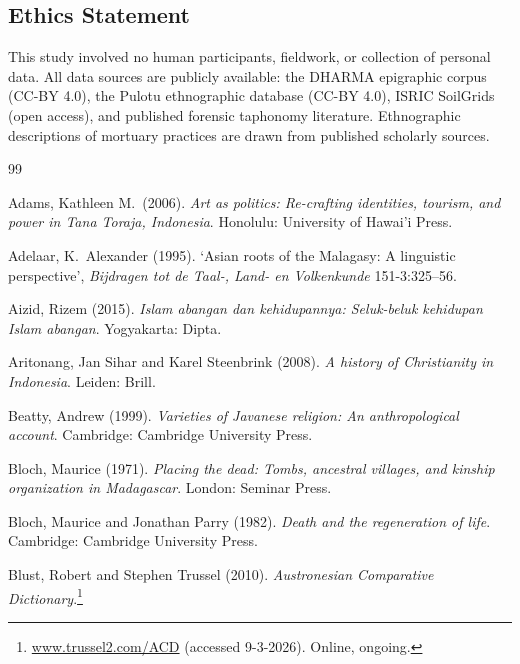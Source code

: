 \documentclass[12pt,a4paper]{article}
\begin{document}
\subsection*{Ethics Statement}

This study involved no human participants, fieldwork, or collection of personal data. All data sources are publicly available: the DHARMA epigraphic corpus (CC-BY 4.0), the Pulotu ethnographic database (CC-BY 4.0), ISRIC SoilGrids (open access), and published forensic taphonomy literature. Ethnographic descriptions of mortuary practices are drawn from published scholarly sources.

\newpage
\begin{thebibliography}{99}

Adams, Kathleen M.\ (2006). \textit{Art as politics: Re-crafting identities, tourism, and power in Tana Toraja, Indonesia}. Honolulu: University of Hawai'i Press.

Adelaar, K.\ Alexander (1995). `Asian roots of the Malagasy: A linguistic perspective', \textit{Bijdragen tot de Taal-, Land- en Volkenkunde} 151-3:325--56.

Aizid, Rizem (2015). \textit{Islam abangan dan kehidupannya: Seluk-beluk kehidupan Islam abangan}. Yogyakarta: Dipta.

Aritonang, Jan Sihar and Karel Steenbrink (2008). \textit{A history of Christianity in Indonesia}. Leiden: Brill.

Beatty, Andrew (1999). \textit{Varieties of Javanese religion: An anthropological account}. Cambridge: Cambridge University Press.

Bloch, Maurice (1971). \textit{Placing the dead: Tombs, ancestral villages, and kinship organization in Madagascar}. London: Seminar Press.

Bloch, Maurice and Jonathan Parry (1982). \textit{Death and the regeneration of life}. Cambridge: Cambridge University Press.

Blust, Robert and Stephen Trussel (2010). \textit{Austronesian Comparative Dictionary}.\footnote{\url{www.trussel2.com/ACD} (accessed 9-3-2026). Online, ongoing.}


\end{thebibliography}
\end{document}
